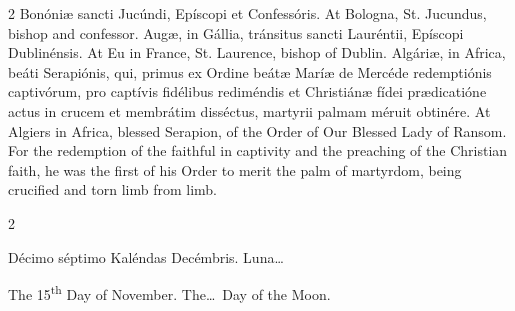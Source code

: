 \begin{paracol}{2}
\switchcolumn*
{}
Bonóniæ sancti Jucúndi, 
 Epíscopi et Confessóris.
\switchcolumn
{}
At Bologna, St. Jucundus, bishop and 
 confessor.
\switchcolumn*
{}
Augæ, in Gállia, 
 tránsitus sancti Lauréntii, Epíscopi Dublinénsis.
\switchcolumn
{}
At Eu in France, St. Laurence, 
 bishop of Dublin.
\switchcolumn*
{}
Algáriæ, in Africa, 
 beáti Serapiónis, qui, primus ex Ordine beátæ Maríæ de Mercéde redemptiónis 
 captivórum, pro captívis fidélibus rediméndis et Christiánæ fídei 
 prædicatióne actus in crucem et membrátim disséctus, martyrii palmam méruit 
 obtinére.
\switchcolumn
{}
At Algiers in Africa, blessed 
 Serapion, of the Order of Our Blessed Lady of Ransom. For the 
 redemption of the faithful in captivity and the preaching of the Christian 
 faith, he was the first of his Order to merit the palm of martyrdom, being 
 crucified and torn limb from limb.
\switchcolumn*
{}
\end{paracol}


\begin{paracol}{2}
\begin{center}{\color{gregoriocolor} Décimo séptimo Kaléndas Decémbris. 
 Luna\dots\ }\end{center}
\switchcolumn
{}
\begin{center}{\color{gregoriocolor} The 
 15\textsuperscript{th} Day of 
 November. The\dots\ Day of the Moon.}\end{center}
\end{paracol}

